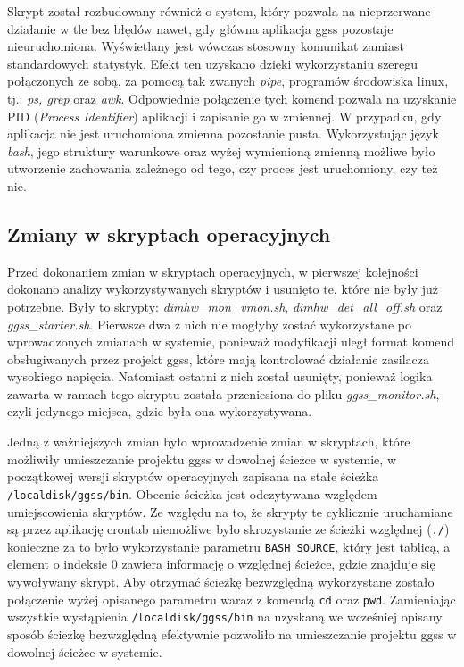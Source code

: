 Skrypt został rozbudowany również o system, który pozwala na nieprzerwane działanie w tle bez błędów nawet, gdy główna aplikacja ggss pozostaje nieuruchomiona. Wyświetlany jest wówczas stosowny komunikat zamiast standardowych statystyk. Efekt ten uzyskano dzięki wykorzystaniu szeregu połączonych ze sobą, za pomocą tak zwanych \emph{pipe}, programów środowiska linux, tj.: \emph{ps, grep} oraz \emph{awk}. Odpowiednie połączenie tych komend pozwala na uzyskanie PID (\emph{Process Identifier}) aplikacji i zapisanie go w zmiennej. W przypadku, gdy aplikacja nie jest uruchomiona zmienna pozostanie pusta. Wykorzystując język \emph{bash}, jego struktury warunkowe oraz wyżej wymienioną zmienną możliwe było utworzenie zachowania zależnego od tego, czy proces jest uruchomiony, czy też nie.


\subsection{Zmiany w skryptach operacyjnych}

Przed dokonaniem zmian w skryptach operacyjnych, w pierwszej kolejności dokonano analizy wykorzystywanych skryptów i usunięto te, które nie były już potrzebne. Były to skrypty: \emph{dimhw\_mon\_vmon.sh}, \emph{dimhw\_det\_all\_off.sh} oraz \emph{ggss\_starter.sh}. Pierwsze dwa z nich nie mogłyby zostać wykorzystane po wprowadzonych zmianach w systemie, ponieważ modyfikacji uległ format komend obsługiwanych przez projekt ggss, które mają kontrolować działanie zasilacza wysokiego napięcia. Natomiast ostatni z nich został usunięty, ponieważ logika zawarta w ramach tego skryptu została przeniesiona do pliku \emph{ggss\_monitor.sh}, czyli jedynego miejsca, gdzie była ona wykorzystywana.

Jedną z ważniejszych zmian było wprowadzenie zmian w skryptach, które możliwiły umieszczanie projektu ggss w dowolnej ścieżce w systemie, w początkowej wersji skryptów operacyjnych zapisana na stałe ścieżka \lstinline{/localdisk/ggss/bin}. Obecnie ścieżka jest odczytywana względem umiejscowienia skryptów. Ze względu na to, że skrypty te cyklicznie uruchamiane są przez aplikację crontab niemożliwe było skrozystanie ze ścieżki względnej (\lstinline{./}) konieczne za to było wykorzystanie parametru \lstinline{BASH_SOURCE}, który jest tablicą, a element o indeksie 0 zawiera informację o względnej ścieżce, gdzie znajduje się wywoływany skrypt. Aby otrzymać ścieżkę bezwzględną wykorzystane zostało połączenie wyżej opisanego parametru waraz z komendą \lstinline{cd} oraz \lstinline{pwd}. Zamieniając wszystkie wystąpienia \lstinline{/localdisk/ggss/bin} na uzyskaną we wcześniej opisany sposób ścieżkę bezwzględną efektywnie pozwoliło na umieszczanie projektu ggss w dowolnej ścieżce w systemie.

